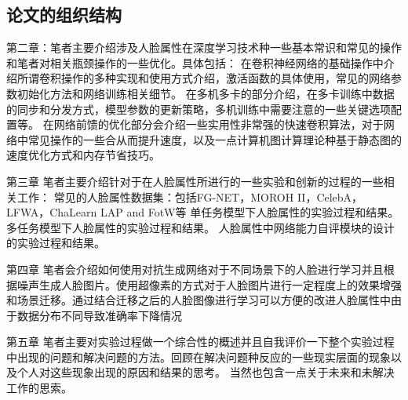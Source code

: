 \subsection{论文的组织结构}
第二章：笔者主要介绍涉及人脸属性在深度学习技术种一些基本常识和常见的操作和笔者对相关瓶颈操作的一些优化。具体包括：
在卷积神经网络的基础操作中介绍所谓卷积操作的多种实现和使用方式介绍，激活函数的具体使用，常见的网络参数初始化方法和网络训练相关细节。
在多机多卡的部分介绍，在多卡训练中数据的同步和分发方式，模型参数的更新策略，多机训练中需要注意的一些关键选项配置等。
在网络前馈的优化部分会介绍一些实用性非常强的快速卷积算法，对于网络中常见操作的一些合从而提升速度，以及一点计算机图计算理论种基于静态图的速度优化方式和内存节省技巧。

第三章
笔者主要介绍针对于在人脸属性所进行的一些实验和创新的过程的一些相关工作：
常见的人脸属性数据集：包括FG-NET，MOROH II，CelebA，LFWA，ChaLearn LAP and FotW等
单任务模型下人脸属性的实验过程和结果。
多任务模型下人脸属性的实验过程和结果。
人脸属性中网络能力自评模块的设计的实验过程和结果。

第四章
笔者会介绍如何使用对抗生成网络对于不同场景下的人脸进行学习并且根据噪声生成人脸图片。使用超像素的方式对于人脸图片进行一定程度上的效果增强和场景迁移。通过结合迁移之后的人脸图像进行学习可以方便的改进人脸属性中由于数据分布不同导致准确率下降情况

第五章
笔者主要对实验过程做一个综合性的概述并且自我评价一下整个实验过程中出现的问题和解决问题的方法。回顾在解决问题种反应的一些现实层面的现象以及个人对这些现象出现的原因和结果的思考。
当然也包含一点关于未来和未解决工作的思索。
